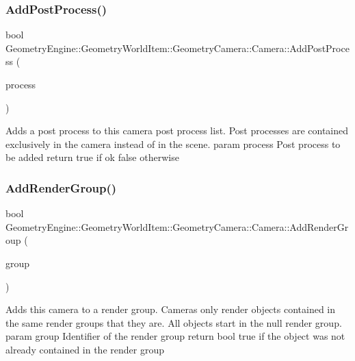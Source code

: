 \subsubsection{\texorpdfstring{AddPostProcess()}{AddPostProcess()}}
{\footnotesize\ttfamily bool Geometry\+Engine\+::\+Geometry\+World\+Item\+::\+Geometry\+Camera\+::\+Camera\+::\+Add\+Post\+Process (\begin{DoxyParamCaption}\item[{const \mbox{\hyperlink{class_geometry_engine_1_1_geometry_post_process_1_1_post_process}{Geometry\+Post\+Process\+::\+Post\+Process}} \&}]{process }\end{DoxyParamCaption})\hspace{0.3cm}{\ttfamily [virtual]}}

Adds a post process to this camera post process list. Post processes are contained exclusively in the camera instead of in the scene. param process Post process to be added return true if ok false otherwise \mbox{\label{class_geometry_engine_1_1_geometry_world_item_1_1_geometry_camera_1_1_camera_a0a76192f4a629a8b6f7a1900078869de}} 
\subsubsection{\texorpdfstring{AddRenderGroup()}{AddRenderGroup()}}
{\footnotesize\ttfamily bool Geometry\+Engine\+::\+Geometry\+World\+Item\+::\+Geometry\+Camera\+::\+Camera\+::\+Add\+Render\+Group (\begin{DoxyParamCaption}\item[{int}]{group }\end{DoxyParamCaption})\hspace{0.3cm}{\ttfamily [virtual]}}

Adds this camera to a render group. Cameras only render objects contained in the same render groups that they are. All objects start in the null render group. param group Identifier of the render group return bool true if the object was not already contained in the render group \mbox{\label{class_geometry_engine_1_1_geometry_world_item_1_1_geometry_camera_1_1_camera_a53b37943c1929fde7396c66a36fb3c52}} 
